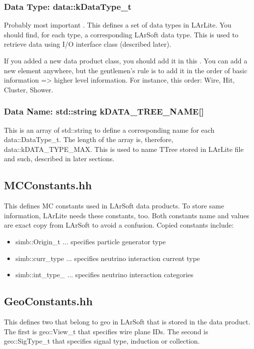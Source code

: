 \subsubsection{Data Type: {\ttfamily \enum data::kDataType\_t}}
Probably most important \enum. This defines a set of data types in LArLite.
You should find, for each type, a corresponding LArSoft data type.
This is used to retrieve data using I/O interface class (described later).

If you added a new data product class, you should add it in this \enum.
You can add a new element anywhere, but the gentlemen's rule is to add it
in the order of basic information => higher level information.
For instance, this order: {\ttfamily Wire, Hit, Cluster, Shower}.

\subsubsection{Data Name: {\ttfamily std::string kDATA\_TREE\_NAME[]}}
This is an array of {\ttfamily std::string} to define a corresponding name for
each {\ttfamily data::DataType\_t}. The length of the array is, therefore,
{\ttfamily data::kDATA\_TYPE\_MAX}. This is used to name {\ttfamily TTree}
stored in LArLite \ROOT file and such, described in later sections.

\subsection{MCConstants.hh}
This defines MC constants used in LArSoft data products.
To store same information, LArLite needs these constants, too.
Both constants name and values are exact copy from LArSoft to avoid a confusion.
Copied constants include:
\begin{itemize}
\item[] {\ttfamily simb::Origin\_t} ... specifies particle generator type
\item[] {\ttfamily simb::curr\_type} ... specifies neutrino interaction current type
\item[] {\ttfamily simb::int\_type\_} ... specifies neutrino interaction categories
\end{itemize}

\subsection{GeoConstants.hh}
This defines two \enum that belong to {\ttfamily geo} in LArSoft that is stored in the data product.
The first is {\ttfamily geo::View\_t} that specifies wire plane IDs.
The second is {\ttfamily geo::SigType\_t} that specifies signal type, induction or collection.

